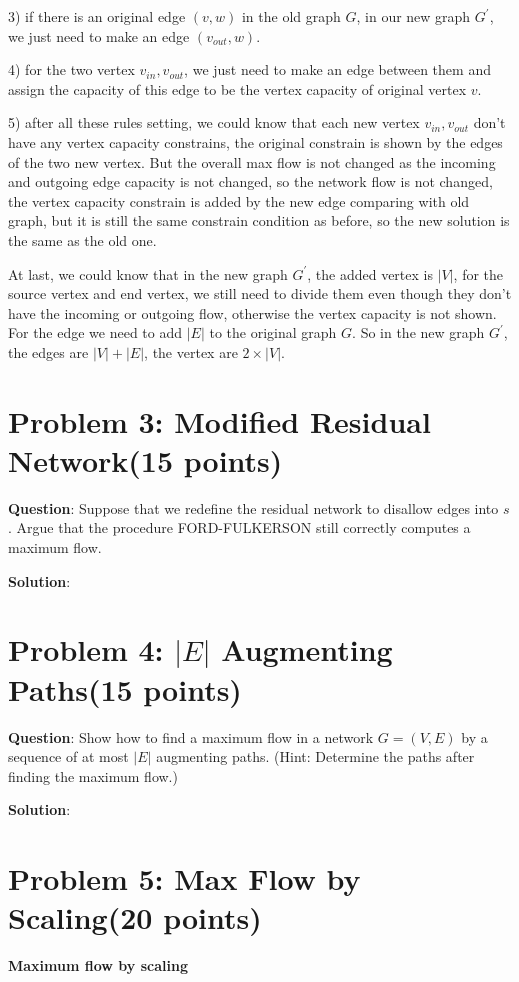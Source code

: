 \documentclass{article}
\begin{document}
3) if there is an original edge $(v, w)$ in the old graph $G$, in our new graph $G^{'}$, we just need to make an
edge $(v_{out}, w)$.

4) for the two vertex $v_{in}, v_{out}$, we just need to make an edge between them and assign the capacity of this
edge to be the vertex capacity of original vertex $v$.

5) after all these rules setting, we could know that each new vertex $v_{in}, v_{out}$ don't have any vertex 
capacity constrains, the original constrain is shown by the edges of the two new vertex. But the overall max
flow is not changed as the incoming and outgoing edge capacity is not changed, so the network flow is not changed,
the vertex capacity constrain is added by the new edge comparing with old graph, but it is still the same constrain
condition as before, so the new solution is the same as the old one.

At last, we could know that in the new graph $G^{'}$, the added vertex is $|V|$, for the source vertex and end vertex,
we still need to divide them even though they don't have the incoming or outgoing flow, otherwise the vertex capacity
is not shown. For the edge we need to add $|E|$ to the original graph $G$. So in the new graph $G^{'}$, the edges are \boldmath\underline{$|V|+|E|$}\unboldmath, the vertex are \boldmath\underline{$2\times|V|$}\unboldmath.


\section{Problem 3: Modified Residual Network(15 points)}
\textbf{Question}: Suppose that we redefine the residual network to disallow edges into $s$. Argue that the procedure FORD-FULKERSON still correctly computes a maximum flow.\newline

\textbf{Solution}:



\section{Problem 4: $|E|$  Augmenting Paths(15 points)}
\textbf{Question}: Show how to find a maximum flow in a network $G = (V, E)$ by a sequence of at most $|E|$ augmenting paths. (Hint: Determine the paths after finding the maximum flow.)\newline

\textbf{Solution}:


\section{Problem 5: Max Flow by Scaling(20 points)}
\textbf{Maximum flow by scaling}
\end{document}
